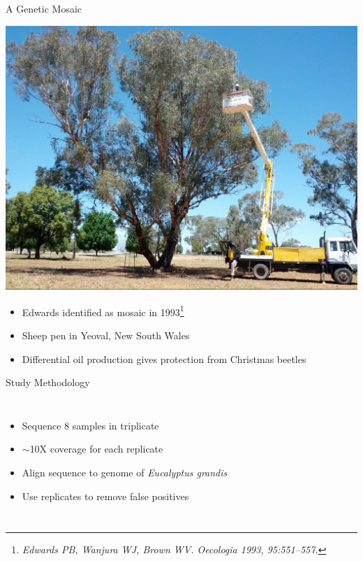 \documentclass{beamer}
\begin{document}
\begin{frame}{A Genetic Mosaic}
	\begin{center}
	\includegraphics[width=.6\linewidth]{unlabeled_tree.jpg}
	\end{center}
	\begin{itemize}
		\item Edwards identified as mosaic in 1993\footnote{\textit{Edwards PB, Wanjura WJ, Brown WV. Oecologia 1993, 95:551–557.}}
		\item Sheep pen in Yeoval, New South Wales
		\item Differential oil production gives protection from Christmas beetles
	\end{itemize}
\end{frame}

\begin{frame}{Study Methodology}
\begin{columns}

\begin{itemize}
\item Sequence 8 samples in triplicate
\item $\sim$10X coverage for each replicate
\item Align sequence to genome of \textit{Eucalyptus grandis}
\item Use replicates to remove false positives
\end{itemize}

\begin{center}
\end{center}
\end{columns}
\end{frame}
\end{document}

